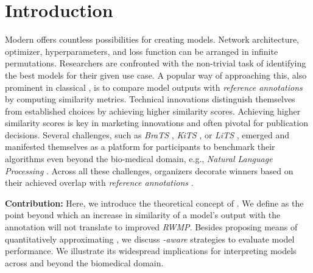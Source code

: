 \section{Introduction}
Modern  offers countless possibilities for creating models.
Network architecture, optimizer, hyperparameters, and loss function can be arranged in infinite permutations.
Researchers are confronted with the non-trivial task of identifying the best models for their given use case.
A popular way of approaching this, also prominent in classical , is to compare model outputs with \emph{reference annotations} by computing similarity metrics.
Technical innovations distinguish themselves from established choices by achieving higher similarity scores.
Achieving higher similarity scores is key in marketing innovations and often pivotal for publication decisions.
Several challenges, such as \emph{BraTS} \citep{menze2014multimodal}, \emph{KiTS} \citep{heller2021state}, or \emph{LiTS} \citep{bilic2019liver}, emerged and manifested themselves as a platform for participants to benchmark their algorithms even beyond the bio-medical domain, e.g., \emph{Natural Language Processing} \citep{parra-escartin-etal-2017-ethical}.
Across all these challenges, organizers decorate winners based on their achieved overlap with \emph{reference annotations} \citep{bakas2018identifying}.


\noindent\textbf{Contribution:}
Here, we introduce the theoretical concept of .
We define  as the point beyond which an increase in similarity of a model's output with the annotation will not translate to improved \emph{RWMP}.
Besides proposing means of quantitatively approximating , we discuss \emph{-aware} strategies to evaluate  model performance.
We illustrate its widespread implications for interpreting  models across and beyond the biomedical domain.